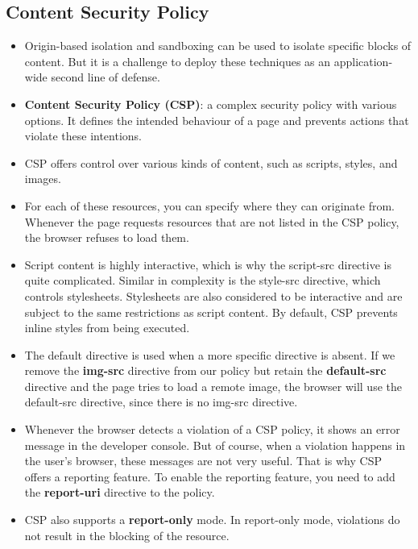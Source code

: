 \documentclass[../main.tex]{subfiles}
\begin{document}
\subsection{Content Security Policy}
\begin{itemize}
\item Origin-based isolation and sandboxing can be used to isolate specific blocks of content. But it is a challenge to deploy these techniques as an application-wide second line of defense.
\item \textbf{Content Security Policy (CSP)}: a complex security policy with various options. It defines the intended behaviour of a page and prevents actions that violate these intentions. 
\item CSP offers control over various kinds of content, such as scripts, styles, and images.
\item For each of these resources, you can specify where they can originate from. Whenever the page requests resources that are not listed in the CSP policy, the browser refuses to load them.
\item Script content is highly interactive, which is why the script-src directive is quite complicated. Similar in complexity is the style-src directive, which controls stylesheets. Stylesheets are also considered to be interactive and are subject to the same restrictions as script content. By default, CSP prevents inline styles from being executed.
\item The default directive is used when a more specific directive is absent. If we remove the \textbf{img-src} directive from our policy but retain the \textbf{default-src} directive  and the page tries to load a remote image, the browser will use the default-src directive, since there is no img-src directive.
\item Whenever the browser detects a violation of a CSP policy, it shows an error message in the developer console. But of course, when a violation happens in the user's browser, these messages are not very useful. That is why CSP offers a reporting feature. To enable the reporting feature, you need to add the \textbf{report-uri} directive to the policy.
\item CSP also supports a \textbf{report-only} mode. In report-only mode, violations do not result in the blocking of the resource.
\end{itemize}
\end{document}

